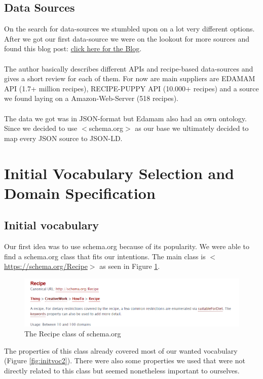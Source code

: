 \documentclass{article}
\begin{document}
\subsection{Data Sources}
On the search for data-sources we stumbled upon on a lot very different options. After we got our first data-source we were on the lookout for more sources and found this blog post:
\href{https://medium.com/groceristar/companies-with-recipe-apis-e9f29a64389c?fbclid=IwAR1cqotmvKyCeA13FEYZwN4p20LB1531emcffBYFMrwe01jOpdQ19CnHCUg}{click here for the Blog}.\\ \\
The author basically describes different APIs and recipe-based data-sources and gives a short review for each of them. For now are main suppliers are EDAMAM API (1.7+ million recipes), RECIPE-PUPPY API (10.000+ recipes) and a source we found laying on a Amazon-Web-Server (518 recipes). \\ \\
The data we got was in JSON-format but Edamam also had an own ontology. Since we decided to use $<$schema.org$>$ as our base we ultimately decided to map every JSON source to JSON-LD. 

\section{Initial Vocabulary Selection and Domain Specification}
\subsection{Initial vocabulary}
Our first idea was to use schema.org because of its popularity. We were able to find a schema.org class that fits our intentions. The main class is $<$\url{https://schema.org/Recipe}$>$ as seen in Figure \ref{fig:initvoc}.

\begin{figure}[H]
  \centering
  \includegraphics[width=12cm]{pictures/init_voc.png}
  \caption{The Recipe class of schema.org}
  \label{fig:initvoc}
\end{figure}
\noindent
The properties of this class already covered most of our wanted vocabulary (Figure \ref{fig:initvoc2}). There were also some properties we used that were not directly related to this class but seemed nonetheless important to ourselves.
\end{document}
